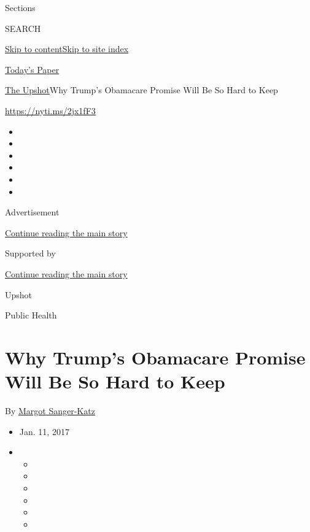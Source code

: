 Sections

SEARCH

\protect\hyperlink{site-content}{Skip to
content}\protect\hyperlink{site-index}{Skip to site index}

\href{https://myaccount.nytimes.com/auth/login?response_type=cookie\&client_id=vi}{}

\href{https://www.nytimes.com/section/todayspaper}{Today's Paper}

\href{/section/upshot}{The Upshot}\textbar{}Why Trump's Obamacare
Promise Will Be So Hard to Keep

\url{https://nyti.ms/2jx1fF3}

\begin{itemize}
\item
\item
\item
\item
\item
\item
\end{itemize}

Advertisement

\protect\hyperlink{after-top}{Continue reading the main story}

Supported by

\protect\hyperlink{after-sponsor}{Continue reading the main story}

Upshot

Public Health

\hypertarget{why-trumps-obamacare-promise-will-be-so-hard-to-keep}{%
\section{Why Trump's Obamacare Promise Will Be So Hard to
Keep}\label{why-trumps-obamacare-promise-will-be-so-hard-to-keep}}

By \href{http://www.nytimes.com/by/margot-sanger-katz}{Margot
Sanger-Katz}

\begin{itemize}
\item
  Jan. 11, 2017
\item
  \begin{itemize}
  \item
  \item
  \item
  \item
  \item
  \item
  \end{itemize}
\end{itemize}


